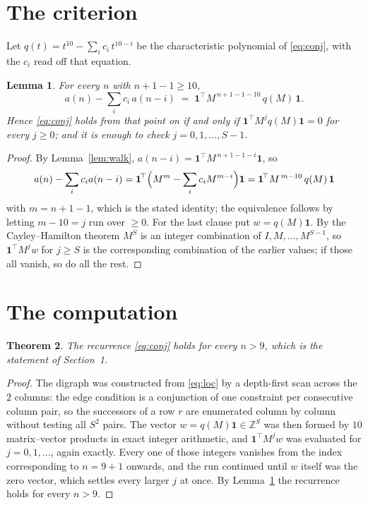 \documentclass[11pt,a4paper]{article}
\theoremstyle{plain}
\newtheorem{theorem}{Theorem}
\newtheorem{lemma}[theorem]{Lemma}
\theoremstyle{definition}
\begin{document}
\section{The criterion}

Let $q(t)=t^{10}-\sum_i c_i\,t^{10-i}$ be the characteristic polynomial of
\eqref{eq:conj}, with the $c_i$ read off that equation.

\begin{lemma}\label{lem:crit}
For every $n$ with $n+1-1\ge10$,
\[
a(n)-\sum_i c_i\,a(n-i)\;=\;\mathbf{1}^{\!\top}M^{\,n+1-1-10}\,q(M)\,\mathbf{1} .
\]
Hence \eqref{eq:conj} holds from that point on if and only if
$\mathbf{1}^{\!\top}M^{j}q(M)\mathbf{1}=0$ for every $j\ge0$; and it is enough to check
$j=0,1,\dots,S-1$.
\end{lemma}

\begin{proof}
By Lemma~\ref{lem:walk}, $a(n-i)=\mathbf{1}^{\!\top}M^{\,n+1-1-i}\mathbf{1}$, so
\[
a(n)-\sum_i c_i a(n-i)
=\mathbf{1}^{\!\top}\Bigl(M^{m}-\sum_i c_i M^{m-i}\Bigr)\mathbf{1}
=\mathbf{1}^{\!\top}M^{\,m-10}\,q(M)\,\mathbf{1}
\]
with $m=n+1-1$, which is the stated identity; the equivalence follows by letting
$m-10=j$ run over $\ge0$. For the last clause put $w=q(M)\mathbf{1}$. By the
Cayley--Hamilton theorem $M^{S}$ is an integer combination of $I,M,\dots,M^{S-1}$, so
$\mathbf{1}^{\!\top}M^{j}w$ for $j\ge S$ is the corresponding combination of the earlier
values; if those all vanish, so do all the rest.
\end{proof}

\section{The computation}

\begin{theorem}
The recurrence \eqref{eq:conj} holds for every $n>9$, which is the statement of
Section~1.
\end{theorem}

\begin{proof}
The digraph was constructed from \eqref{eq:loc} by a depth-first scan across the $2$
columns: the edge condition is a conjunction of one constraint per consecutive column
pair, so the successors of a row $r$ are enumerated column by column without testing all
$S^2$ pairs. The vector $w=q(M)\mathbf{1}\in\mathbb{Z}^{S}$ was then formed by $10$
matrix--vector products in exact integer arithmetic, and $\mathbf{1}^{\!\top}M^{j}w$ was
evaluated for $j=0,1,\dots$, again exactly. Every one of those integers vanishes from the
index corresponding to $n=9+1$ onwards, and the run continued until $w$ itself was the
zero vector, which settles every larger $j$ at once. By Lemma~\ref{lem:crit} the recurrence
holds for every $n>9$.
\end{proof}
\end{document}
